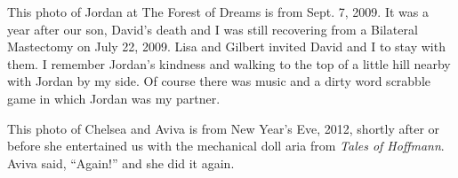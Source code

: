 \begin{window}
\smallskip
This photo of Jordan at The Forest of Dreams is from Sept. 7, 2009. It was
a year after our son, David's death and I was still recovering from
a Bilateral Mastectomy on July 22, 2009. Lisa and Gilbert invited David and
I to stay with them. I remember Jordan's kindness and walking to the top of
a little hill nearby with Jordan by my side. Of course there was music and
a dirty word scrabble game in which Jordan was my partner.
\end{window}

\begin{window} \smallskip
This photo of Chelsea and Aviva is from New Year's Eve, 2012, shortly after or
before she entertained us with the mechanical doll aria from {\it Tales of
Hoffmann}. Aviva said, ``Again!'' and she did it again.
\end{window}

